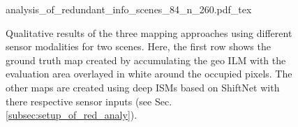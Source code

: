 
%
\begin{figure}[H]
	\begin{center}
		{analysis_of_redundant_info_scenes_84_n_260.pdf_tex}
		\caption{\label{fig:qual_analysis_of_redundant_info}Qualitative results of the three mapping approaches using different sensor modalities for two scenes. Here, the first row shows the ground truth map created by accumulating the geo ILM with the evaluation area overlayed in white around the occupied pixels. The other maps are created using deep ISMs based on ShiftNet with there respective sensor inputs (see Sec. \ref{subsec:setup_of_red_analy}).}
	\end{center}
\end{figure}

